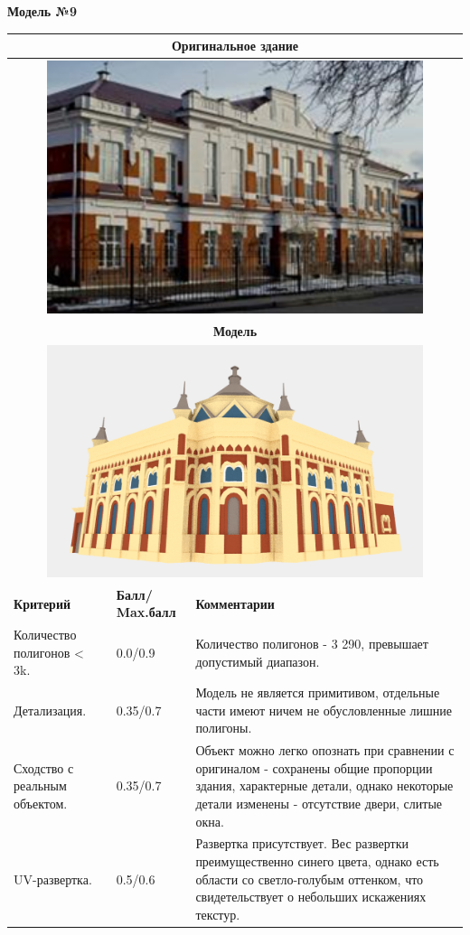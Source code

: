 \begin{center}
    \textbf{Модель №9}
\end{center}

\begin{longtable}{|p{4cm}|p{2.5cm}|p{7.5cm}|}
    \hline
    \multicolumn{3}{|c|}{\textbf{Оригинальное здание} } \\
    \hline
    \multicolumn{3}{|c|}{\includegraphics[width=11cm]{10}} \\
    \hline
    \multicolumn{3}{|c|}{\textbf{Модель}} \\
    \hline
    \multicolumn{3}{|c|}{\includegraphics[width=11cm]{src/model_9}} \\
    \hline
    \textbf{Критерий} & \textbf{Балл/ Max.балл} & \textbf{Комментарии} \\
    \hline
    Количество полигонов < 3k. & 0.0/0.9 & Количество полигонов - 3 290, превышает допустимый диапазон. \\
    \hline
    Детализация. & 0.35/0.7 & Модель не является примитивом, отдельные части имеют ничем не обусловленные лишние полигоны. \\
    \hline 
    Сходство с реальным объектом. & 0.35/0.7 & Объект можно легко опознать при сравнении с оригиналом - сохранены общие пропорции здания, характерные детали, однако некоторые детали изменены - отсутствие двери, слитые окна. \\
    \hline
    UV-развертка. & 0.5/0.6 & Развертка присутствует. Вес развертки преимущественно синего цвета, однако есть области со светло-голубым оттенком, что свидетельствует о небольших искажениях текстур.


\end{longtable}
